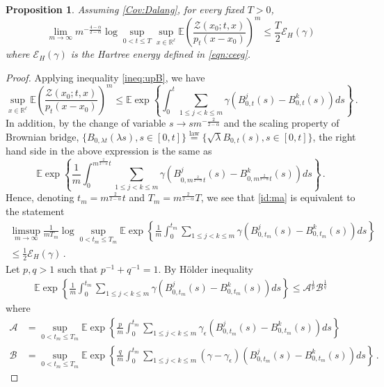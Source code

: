 \documentclass[12pt,reqno]{amsart}
\newtheorem{proposition}[theorem]{Proposition}
\theoremstyle{remark}
\newcommand{\1}{\mathbf{1}}
\def\RR{\mathbb{R}}
\def\EE{\mathbb{E}}
\def\Z{\mathcal{Z}}
\def\A{\mathcal{A}}
\def\B{\mathcal{B}}
\def\cee{{\mathcal E}}
\def\lt{\left}
\def\rt{\right}
\begin{document}
	\begin{proposition}\label{prop:H2m}
		Assuming \ref{Cov:Dalang}, for every fixed $T>0$, 
		\begin{equation}\label{id:ma}
			\lim_{m\to\infty}m^{-\frac{4-\alpha}{2-\alpha}}\log\sup_{0<t\le T}\sup_{x\in\RR^\ell}\EE\lt(\frac{\Z(x_0;t,x)}{p_t(x-x_0)}\rt)^m\leq\frac T2\cee_H(\gamma)
		\end{equation}
		where $\cee_H(\gamma)$ is the Hartree energy defined in \eqref{eqn:ceeg}.
	\end{proposition}
	\begin{proof}%
		 Applying inequality \eqref{ineq:upB}, we have
		\begin{equation*}
			\sup_{x\in\RR^\ell}\EE\lt(\frac{\Z(x_0;t,x)}{p_t(x-x_0)}\rt)^m\le \EE\exp\lt\{\int_0^t\sum_{1\le j<k\le m}\gamma(B_{0,t}^j(s)-B_{0,t}^k(s))ds \rt\}\,.
		\end{equation*}
		In addition, by the change of variable $s \rightarrow s m^{-\frac{2}{2- \alpha}}$ and the scaling property of Brownian bridge, $\{B_{0,\lambda t}(\lambda s),s\in[0, t]\} \stackrel{\mbox{law}}{=} \{\sqrt{\lambda} B_{0,t}(s),s\in[0,t]\}$, the right hand side in the above expression is the same as
		\begin{equation*}
		 	\EE\exp\lt\{\frac1m\int_0^{m^{\frac2{2-\alpha}}t}\sum_{1\le j<k\le m}\gamma\left(B_{0,m^{\frac2{2-\alpha}}t}^j(s)-B_{0,m^{\frac2{2-\alpha}}t}^k(s)\right)ds \rt\}\,.
		\end{equation*}
		Hence, denoting $t_m=m^{\frac2{2- \alpha}}t$ and $T_m=m^{\frac2{2- \alpha}}T$, we see that \eqref{id:ma} is equivalent to the statement
		\begin{multline}\label{tmp1}
			\limsup_{m\to\infty}\frac1{mT_m} \log\sup_{0<t_m\le T_m}\EE\exp\lt\{\frac1m\int_0^{t_m}\sum_{1\le j<k\le m}\gamma(B_{0,t_m}^j(s)-B_{0,t_m}^k(s))ds \rt\}
			\\\le \frac 12 \cee_H(\gamma)\,.
		\end{multline}
		Let $p,q>1$ such that $p^{-1}+q^{-1}=1$. By H\"older inequality
		\begin{align*}
		 	\EE\exp\lt\{\frac1m\int_0^{t_m}\sum_{1\le j<k\le m}\gamma(B_{0,t_m}^j(s)-B_{0,t_m}^k(s))ds \rt\}
		 	\le \A^{\frac1p}\B^{\frac1q}
		\end{align*} 
		where
		\begin{align*}
			\A&=\sup_{0<t_m\le T_m} \EE\exp\lt\{\frac pm\int_0^{t_m}\sum_{1\le j<k\le m}\gamma_ \epsilon(B_{0,t_m}^j(s)-B_{0,t_m}^k(s))ds \rt\}
			\\\B&=\sup_{0<t_m\le T_m}\EE\exp\lt\{\frac qm\int_0^{t_m}\sum_{1\le j<k\le m}(\gamma- \gamma_\epsilon)(B_{0,t_m}^j(s)-B_{0,t_m}^k(s))ds \rt\}\,.

\end{align*}
\end{proof}
\end{document}
